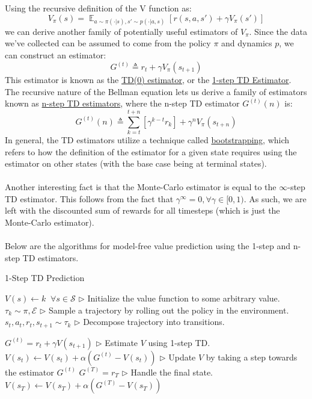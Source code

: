 \documentclass[11pt]{article}
\begin{document}
Using the recursive definition of the V function as:
\begin{equation}
    V_\pi(s) = \mathop{\mathbb{E}}_{a \sim \pi(\cdot|s), s' \sim p(\cdot | a, s)}[r(s, a, s') + \gamma V_\pi(s')]
\end{equation}
we can derive another family of potentially useful estimators of $V_\pi$. Since the data we've collected can be assumed to come from the policy $\pi$ and dynamics $p$, we can construct an estimator:
\begin{equation}
    G^{(t)} \triangleq r_t + \gamma V_\pi(s_{t+1})
\end{equation}
This estimator is known as the \underline{TD(0) estimator}, or the \underline{1-step TD Estimator}. The recursive nature of the Bellman equation lets us derive a family of estimators known as \underline{n-step TD estimators}, where the n-step TD estimator $G^{(t)}(n)$ is:
\begin{equation}
    G^{(t)}(n) \triangleq \sum_{k=t}^{t+n} [\gamma^{k-t} r_{k}] + \gamma^n V_\pi(s_{t+n})
\end{equation}
In general, the TD estimators utilize a technique called \underline{bootstrapping}, which refers to how the definition of the estimator for a given state requires using the estimator on other states (with the base case being at terminal states).\\\\
Another interesting fact is that the Monte-Carlo estimator is equal to the $\infty$-step TD estimator. This follows from the fact that $\gamma^\infty = 0, \forall \gamma \in [0, 1)$. As such, we are left with the discounted sum of rewards for all timesteps (which is just the Monte-Carlo estimator).\\\\

Below are the algorithms for model-free value prediction using the 1-step and n-step TD estimators.

\begin{algorithm}[H]
\caption{1-Step TD Prediction}
\label{algo:1step_td}
\begin{algorithmic}[1]
\STATE $V(s) \leftarrow k \;\; \forall s \in \mathcal{S}$ \hfill $\triangleright$ Initialize the value function to some arbitrary value.
    \STATE $\tau_k \sim \pi, \mathcal{E}$ \hfill $\triangleright$ Sample a trajectory by rolling out the policy in the environment.
    \STATE ${s_t, a_t, r_t, s_{t+1}} \sim \tau_k$ \hfill $\triangleright$ Decompose trajectory into transitions.
    
        \STATE $G^{(t)} = r_t + \gamma V(s_{t+1})$ \hfill $\triangleright$ Estimate $V$ using 1-step TD.
        \STATE $V(s_t) \leftarrow V(s_t) + \alpha (G^{(t)} - V(s_t))$ \hfill $\triangleright$ Update $V$ by taking a step towards the estimator $G^{(t)}$
    \ENDFOR
    \STATE $G^{(T)} = r_T$ \hfill $\triangleright$ Handle the final state.
    \STATE $V(s_T) \leftarrow V(s_T) + \alpha (G^{(T)} - V(s_T))$
\ENDFOR
\end{algorithmic}
\end{algorithm}
\end{document}
